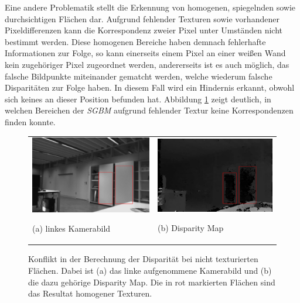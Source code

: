 \noindent
Eine andere Problematik stellt die Erkennung von homogenen, spiegelnden sowie durchsichtigen Flächen dar. Aufgrund fehlender Texturen sowie vorhandener Pixeldifferenzen kann die Korrespondenz zweier Pixel unter Umständen nicht bestimmt werden. Diese homogenen Bereiche haben demnach fehlerhafte Informationen zur Folge, so kann  einerseits einem Pixel an einer weißen Wand kein zugehöriger Pixel zugeordnet werden, andererseits ist es auch möglich, das falsche Bildpunkte miteinander gematcht werden, welche wiederum falsche Disparitäten zur Folge haben. In diesem Fall wird ein Hindernis erkannt, obwohl sich keines an dieser Position befunden hat. Abbildung \ref{fig:disparity-error-homogeneous} zeigt deutlich, in welchen Bereichen der \emph{SGBM} aufgrund fehlender Textur keine Korrespondenzen finden konnte.\\

\begin{figure}[h]
	\centering
	\begin{tabular}{m{6.5cm} m{6.5cm}}
	\includegraphics[width=6.5cm]{img/disparity_error_left.pdf}
	\begin{center} \small (a) linkes Kamerabild \end{center}
	&
	\includegraphics[width=6.5cm]{img/disparity_error.pdf}
	\begin{center} \small (b) Disparity Map \end{center}
	\end{tabular}
    \caption{Konflikt in der Berechnung der Disparität bei nicht texturierten Flächen. Dabei ist (a) das linke aufgenommene Kamerabild und (b) die dazu gehörige Disparity Map. Die in rot markierten Flächen sind das Resultat homogener Texturen.}
    \label{fig:disparity-error-homogeneous}
\end{figure}

